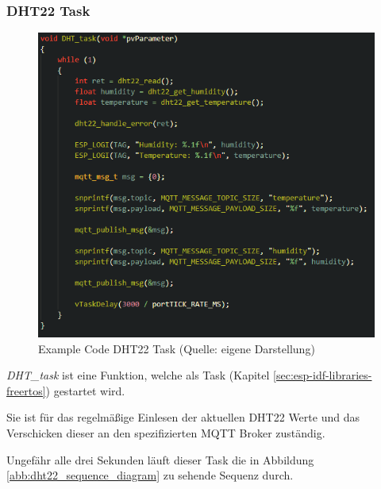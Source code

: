 \subsubsection{DHT22 Task}

\begin{figure}[H]
    \begin{center}
        \includegraphics[scale=0.8]{images/example_code_dht22_task.png}
        \caption{Example Code DHT22 Task (Quelle: eigene Darstellung)}
        \label{abb:example_code_dht22_task}
    \end{center}
\end{figure}

\textit{DHT\_task} ist eine Funktion, welche als Task (Kapitel \ref{sec:esp-idf-libraries-freertos}) gestartet wird. 

Sie ist für das regelmäßige Einlesen der aktuellen DHT22 Werte und das Verschicken dieser an den spezifizierten MQTT Broker zuständig.

Ungefähr alle drei Sekunden läuft dieser Task die in Abbildung \ref{abb:dht22_sequence_diagram} zu sehende Sequenz durch.


